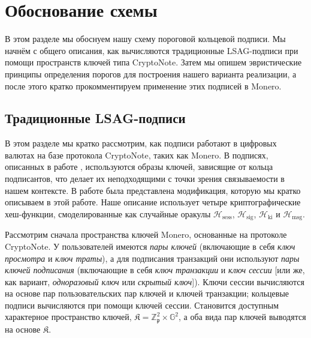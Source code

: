 \documentclass{mrl}
\theoremstyle{definition}
\numberwithin{theorem}{subsection}
\newcommand{\scalarField}{\mathbb{Z}_{\mathfrak{p}}}
\newcommand{\group}{\mathbb{G}}
\begin{document}
\section{Обоснование схемы}\label{motivation}

В этом разделе мы обоснуем нашу схему пороговой кольцевой подписи. Мы начнём с общего описания, как вычисляются традиционные LSAG-подписи при помощи пространств ключей типа CryptoNote. Затем мы опишем эвристические принципы определения порогов для построения нашего варианта реализации, а после этого кратко прокомментируем применение этих подписей в Monero. %

\subsection{Традиционные LSAG-подписи}\label{lsagFirst}

В этом разделе мы кратко рассмотрим, как подписи работают в цифровых валютах на базе протокола CryptoNote, таких как Monero. В подписях, описанных в работе \cite{liu2004linkable}, используются образы ключей, зависящие от кольца подписантов, что делает их неподходящими с точки зрения связываемости в нашем контексте. В работе \cite{backLSAG} была представлена модификация, которую мы кратко описываем в этой работе. Наше описание использует четыре криптографические хеш-функции, смоделированные как случайные оракулы $\mathcal{H}_{\text{sess}}$, $\mathcal{H}_{\text{sig}}$, $\mathcal{H}_{\text{ki}}$ и $\mathcal{H}_{\text{msg}}$.

Рассмотрим сначала пространства ключей Monero, основанные на протоколе CryptoNote. У пользователей имеются \textit{пары ключей} (включающие в себя \textit{ключ просмотра} и \textit{ключ траты}), а для подписания транзакций они используют \textit{пары ключей подписания} (включающие в себя \textit{ключ транзакции} и \textit{ключ сессии} [или же, как вариант, \textit{одноразовый ключ} или \textit{скрытый ключ}]). Ключи сессии вычисляются на основе пар пользовательских пар ключей и ключей транзакции; кольцевые подписи вычисляются при помощи ключей сессии. Становится доступным характерное пространство ключей, $\mathfrak{K} = \scalarField^2 \times \group^2$, а оба вида пар ключей выводятся на основе $\mathfrak{K}$.
\end{document}

